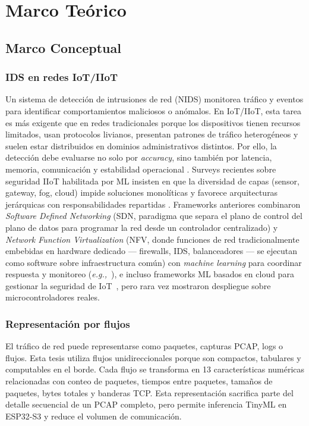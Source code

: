 \chapter{Marco Teórico}
\label{chap:theo}

\section{Marco Conceptual}
\label{sec:conceptos}

\subsection{IDS en redes IoT/IIoT}
Un sistema de detección de intrusiones de red (NIDS) monitorea tráfico y eventos para identificar comportamientos maliciosos o anómalos. En IoT/IIoT, esta tarea es más exigente que en redes tradicionales porque los dispositivos tienen recursos limitados, usan protocolos livianos, presentan patrones de tráfico heterogéneos y suelen estar distribuidos en dominios administrativos distintos. Por ello, la detección debe evaluarse no solo por \textit{accuracy}, sino también por latencia, memoria, comunicación y estabilidad operacional \cite{Tekin2023_OnDeviceEnergy, Amuthadevi2025}. Surveys recientes sobre seguridad IIoT habilitada por ML insisten en que la diversidad de capas (sensor, gateway, fog, cloud) impide soluciones monolíticas y favorece arquitecturas jerárquicas con responsabilidades repartidas \cite{Ni2024_IIoT_Security_Survey, Amanullah2020_DL_BigData_IoT_Security}. Frameworks anteriores combinaron \emph{Software Defined Networking} (SDN, paradigma que separa el plano de control del plano de datos para programar la red desde un controlador centralizado) y \emph{Network Function Virtualization} (NFV, donde funciones de red tradicionalmente embebidas en hardware dedicado --- firewalls, IDS, balanceadores --- se ejecutan como software sobre infraestructura común) con \emph{machine learning} para coordinar respuesta y monitoreo (\emph{e.g.,}~\cite{Bagaa2020_ML_IoT_Framework, Huda2018_DBN_SCADA}), e incluso frameworks ML basados en cloud para gestionar la seguridad de IoT~\cite{Mohamed2024_ML_CloudIoT}, pero rara vez mostraron despliegue sobre microcontroladores reales.

\subsection{Representación por flujos}
El tráfico de red puede representarse como paquetes, capturas PCAP, logs o flujos. Esta tesis utiliza flujos unidireccionales porque son compactos, tabulares y computables en el borde. Cada flujo se transforma en 13 características numéricas relacionadas con conteo de paquetes, tiempos entre paquetes, tamaños de paquetes, bytes totales y banderas TCP. Esta representación sacrifica parte del detalle secuencial de un PCAP completo, pero permite inferencia TinyML en ESP32-S3 y reduce el volumen de comunicación.

